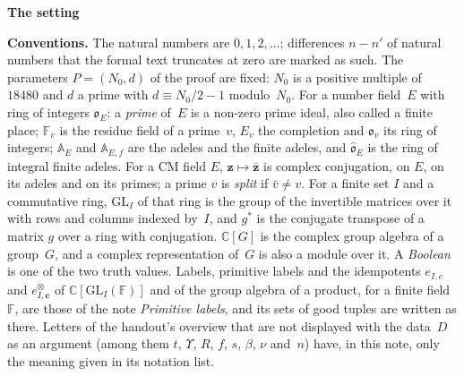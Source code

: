 \documentclass[11pt,a4paper]{article}
\newcommand{\F}{\mathbb{F}}
\newcommand{\m}[1]{\mbox{$#1$}}        %
\newcommand{\sect}[2]{\refstepcounter{section}\label{#2}\par\addvspace{19pt plus 4pt minus 2pt}\Needspace{7\baselineskip}%
  \noindent\llap{{\fontsize{13.2}{16}\selectfont\bfseries\color{inkfaint}\thesection}\hspace{9pt}}%
  {\fontsize{13.2}{16}\selectfont\bfseries\color{ink}#1}\par\nopagebreak\vspace{-1pt}}
\theoremstyle{plainx}
\theoremstyle{uprightx}
\newenvironment{conventions}{\par\addvspace{5pt}\noindent\textbf{Conventions.}\enspace\ignorespaces}{\par\addvspace{3pt}}
\newcommand{\GL}{\mathrm{GL}}
\begin{document}
\sect{The setting}{s:setting}
\begin{conventions}\label{c:conventions}
The natural numbers are \m{0,1,2,\dots}; differences \m{n-n'} of natural numbers that the formal text truncates at
zero are marked as such. The parameters \m{P=(N_0,d)} of the proof are fixed: $N_0$ is a positive multiple
of~$18480$ and $d$ a prime with \m{d\equiv N_0/2-1} modulo~$N_0$. For a number field~$E$ with ring of integers
$\mathfrak{o}_E$: a \emph{prime} of~$E$ is a non-zero prime ideal, also called a finite place; $\F_v$ is the residue field
of a prime~$v$, $E_v$ the completion and $\mathfrak{o}_v$ its ring of integers; $\mathbb A_E$ and $\mathbb A_{E,f}$ are the
adeles and the finite adeles, and $\hat{\mathfrak{o}}_E$ is the ring of integral finite adeles. For a CM field $E$,
\m{\mathbf{z}\mapsto\bar{\mathbf{z}}} is complex conjugation, on $E$, on its adeles and on its primes; a prime $v$ is \emph{split} if
\m{\bar v\ne v}. For a finite set $I$ and a commutative ring, \m{\GL_I} of that ring is the group of the invertible matrices
over it with rows and columns indexed by~$I$, and $g^*$ is the conjugate transpose of a matrix $g$ over a ring
with conjugation. \m{\mathbb C[G]} is the complex group algebra of a group~$G$, and a complex representation
of~$G$ is also a module over it. A \emph{Boolean} is one of the two truth values. Labels, primitive labels and
the idempotents \m{e_{I,c}} and \m{e^{\otimes}_{I,\mathbf c}} of \m{\mathbb C[\GL_I(\F)]} and of the group algebra of
a product, for a finite field~$\F$, are those of the note \emph{Primitive labels}, and its sets of good
tuples are written as there. Letters of the handout's overview that are not displayed with the data~$D$ as an
argument (among them $t$, $\Upsilon$, $R$, $f$, $s$, $\beta$, $\nu$ and~$n$) have, in this note, only the meaning given
in its notation list.
\end{conventions}
\end{document}
